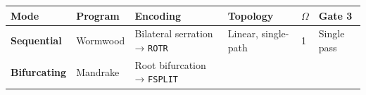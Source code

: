 \documentclass[12pt,a4paper]{article}
\begin{document}
\begin{longtable}[]{@{}llllll@{}}
\toprule
\begin{minipage}[b]{0.09\columnwidth}\raggedright
Mode\strut
\end{minipage} & \begin{minipage}[b]{0.14\columnwidth}\raggedright
Program\strut
\end{minipage} & \begin{minipage}[b]{0.16\columnwidth}\raggedright
Encoding\strut
\end{minipage} & \begin{minipage}[b]{0.16\columnwidth}\raggedright
Topology\strut
\end{minipage} & \begin{minipage}[b]{0.16\columnwidth}\raggedright
\(\Omega\)\strut
\end{minipage} & \begin{minipage}[b]{0.13\columnwidth}\raggedright
Gate 3\strut
\end{minipage}\tabularnewline
\midrule
\endhead
\begin{minipage}[t]{0.09\columnwidth}\raggedright
\textbf{Sequential}\strut
\end{minipage} & \begin{minipage}[t]{0.14\columnwidth}\raggedright
Wormwood\strut
\end{minipage} & \begin{minipage}[t]{0.16\columnwidth}\raggedright
Bilateral serration → \texttt{ROTR}\strut
\end{minipage} & \begin{minipage}[t]{0.16\columnwidth}\raggedright
Linear, single-path\strut
\end{minipage} & \begin{minipage}[t]{0.16\columnwidth}\raggedright
1\strut
\end{minipage} & \begin{minipage}[t]{0.13\columnwidth}\raggedright
Single pass\strut
\end{minipage}\tabularnewline
\begin{minipage}[t]{0.09\columnwidth}\raggedright
\textbf{Bifurcating}\strut
\end{minipage} & \begin{minipage}[t]{0.14\columnwidth}\raggedright
Mandrake\strut
\end{minipage} & \begin{minipage}[t]{0.16\columnwidth}\raggedright
Root bifurcation → \texttt{FSPLIT}\strut
\end{minipage} & \begin{minipage}[t]{0.16\columnwidth}\raggedright

\end{minipage}
\end{longtable}
\end{document}
